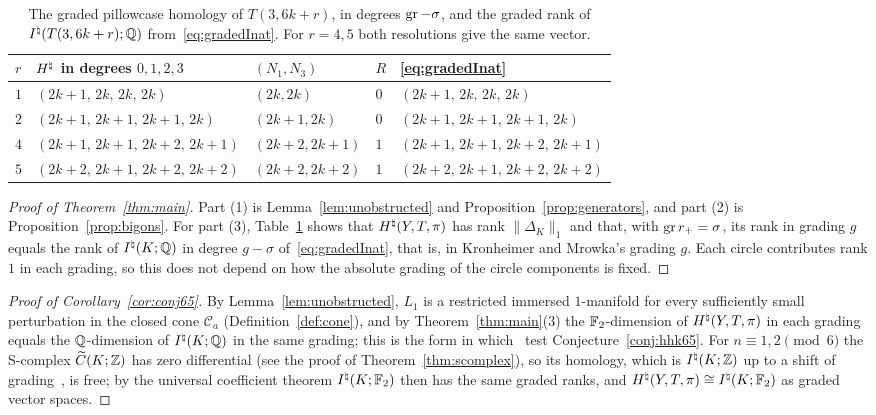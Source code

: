\begin{table}[ht]
\centering\small
\begin{tabular}{lllll}
\toprule
$r$ & $H^{\natural}$ in degrees $0,1,2,3$ & $(N_1,N_3)$ & $R$ & \eqref{eq:gradedInat}\\
\midrule
$1$ & $(2k+1,\,2k,\,2k,\,2k)$ & $(2k,2k)$ & $0$ & $(2k+1,\,2k,\,2k,\,2k)$\\
$2$ & $(2k+1,\,2k+1,\,2k+1,\,2k)$ & $(2k+1,2k)$ & $0$ & $(2k+1,\,2k+1,\,2k+1,\,2k)$\\
$4$ & $(2k+1,\,2k+1,\,2k+2,\,2k+1)$ & $(2k+2,2k+1)$ & $1$ & $(2k+1,\,2k+1,\,2k+2,\,2k+1)$\\
$5$ & $(2k+2,\,2k+1,\,2k+2,\,2k+2)$ & $(2k+2,2k+2)$ & $1$ & $(2k+2,\,2k+1,\,2k+2,\,2k+2)$\\
\bottomrule
\end{tabular}
\medskip
\caption{The graded pillowcase homology of $T(3,6k+r)$, in degrees $\operatorname{gr}-\sigma$, and the graded rank of
$I^{\natural}(T(3,6k+r);\mathbb{Q})$ from~\eqref{eq:gradedInat}. For $r=4,5$ both resolutions give the same vector.}
\label{tab:totals}
\end{table}

\begin{proof}[Proof of Theorem~\ref{thm:main}]
Part (1) is Lemma~\ref{lem:unobstructed} and Proposition~\ref{prop:generators}, and part (2) is
Proposition~\ref{prop:bigons}. For part (3), Table~\ref{tab:totals} shows that $H^{\natural}(Y,T,\pi)$ has rank
$\|\Delta_K\|_1$ and that, with $\operatorname{gr} r_+=\sigma$, its rank in grading $g$ equals the rank of $I^{\natural}(K;\mathbb{Q})$ in degree
$g-\sigma$ of~\eqref{eq:gradedInat}, that is, in Kronheimer and Mrowka's grading $g$. Each circle contributes rank
$1$ in each grading, so this does not depend on how the absolute grading of the circle components is fixed.
\end{proof}

\begin{proof}[Proof of Corollary~\ref{cor:conj65}]
By Lemma~\ref{lem:unobstructed}, $L_1$ is a restricted immersed $1$-manifold for every sufficiently small perturbation
in the closed cone $\mathcal C_a$ (Definition~\ref{def:cone}), and by Theorem~\ref{thm:main}(3) the $\mathbb{F}_2$-dimension of $H^{\natural}(Y,T,\pi)$ in each grading equals the
$\mathbb{Q}$-dimension of $I^{\natural}(K;\mathbb{Q})$ in the same grading; this is the form in which~\cite[\S11]{HHK2} test
Conjecture~\ref{conj:hhk65}. For $n\equiv1,2\pmod6$ the S-complex $\widetilde C(K;\mathbb{Z})$ has zero differential (see the proof of
Theorem~\ref{thm:scomplex}), so its homology, which is $I^{\natural}(K;\mathbb{Z})$ up to a shift of
grading~\cite[Thm.~8.9]{DSEquiv}, is free; by the universal coefficient theorem $I^{\natural}(K;\mathbb{F}_2)$ then has the
same graded ranks, and $H^{\natural}(Y,T,\pi)\cong I^{\natural}(K;\mathbb{F}_2)$ as graded vector spaces.
\end{proof}

